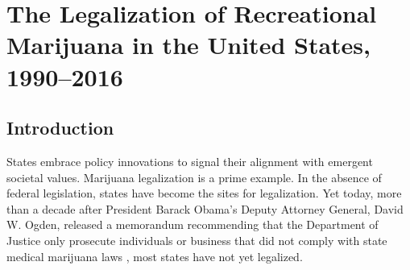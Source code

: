 \chapter{The Legalization of Recreational Marijuana in the United States, 1990--2016}







\section{Introduction}

States embrace policy innovations to signal their alignment with emergent societal values. Marijuana legalization is a prime example. In the absence of federal legislation, states have become the sites for legalization. Yet today, more than a decade after President Barack Obama's Deputy Attorney General, David W. Ogden, released a memorandum recommending that the Department of Justice only prosecute individuals or business that did not comply with state medical marijuana laws \citep{ogden_2009}, most states have not yet legalized.

